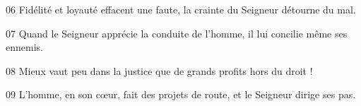 
06 Fidélité et loyauté effacent une faute, la crainte du Seigneur détourne du mal.

07 Quand le Seigneur apprécie la conduite de l’homme, il lui concilie même ses ennemis.

08 Mieux vaut peu dans la justice que de grands profits hors du droit !

09 L’homme, en son cœur, fait des projets de route, et le Seigneur dirige ses pas.
